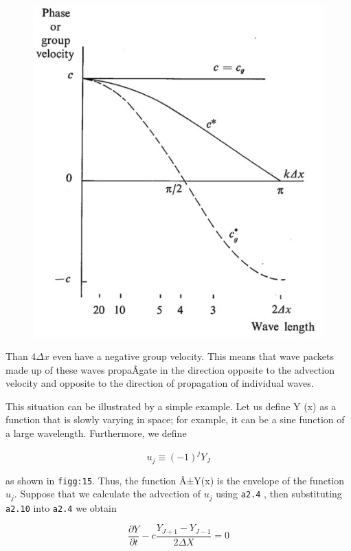 \begin{figure}
 \centering
 \includegraphics[keepaspectratio]{figs/NM/pic14.jpg}
 \caption{} \label{fig:}
\end{figure}

Than \(4\Delta x\) even have a negative group velocity. This means that
wave packets made up of these waves propaÂ­gate in the direction opposite
to the advection velocity and opposite to the direction of propagation
of individual waves.

This situation can be illustrated by a simple example. Let us define Y
(x) as a function that is slowly varying in space; for example, it can
be a sine function of a large wavelength. Furthermore, we define

 {\[u_{j} \equiv \left( - 1 \right)^{j}Y_{J}\]}

as shown in \texttt{figg:15}. Thus, the function Â±Y(x) is the envelope
of the function \(u_{j}\). Suppose that we calculate the advection of
\(u_{j}\) using \texttt{a2.4} , then substituting \texttt{a2.10} into
\texttt{a2.4} we obtain

\[\frac{\partial Y}{\partial t} - c\frac{Y_{J + 1} - Y_{J - 1}}{2\Delta X} = 0\]

